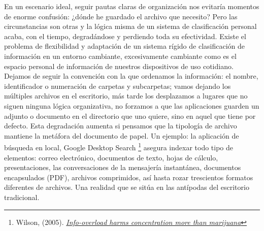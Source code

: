 \documentclass[12pt, a4paper,twoside]{book}
\begin{document}
En un escenario ideal, seguir pautas claras de organización nos
evitaría momentos de enorme confusión: ¿dónde he guardado el
archivo que necesito? Pero las circunstancias son otras y la lógica
misma de un sistema de clasificación personal acaba, con el tiempo,
degradándose y perdiendo toda su efectividad. Existe el problema de
flexibilidad y adaptación de un sistema rígido de clasificación de
información en un entorno cambiante, excesivamente cambiante como
es el espacio personal de información de nuestros dispositivos de
uso cotidiano. Dejamos de seguir la convención con la que ordenamos
la información: el nombre, identificador o numeración de carpetas y
subcarpetas; vamos dejando los múltiples archivos en el escritorio,
más tarde los desplazamos a lugares que no siguen ninguna lógica
organizativa, no forzamos a que las aplicaciones guarden un adjunto
o documento en el directorio que uno quiere, sino en aquel que
tiene por defecto. Esta degradación aumenta si pensamos que la
tipología de archivo mantiene la metáfora del documento de papel.
Un ejemplo: la aplicación de búsqueda en local, Google Desktop
Search%
\footnote{Wilson, (2005).
\emph{\href{http://www.newscientist.com/article/mg18624973.400}{Info-overload harms concentration more than marijuana}}}
asegura indexar todo tipo de elementos: correo electrónico,
documentos de texto, hojas de cálculo, presentaciones, las
conversaciones de la mensajería instantánea, documentos
encapsulados (PDF), archivos comprimidos, así hasta rozar
trescientos formatos diferentes de archivos. Una realidad que se
sitúa en las antípodas del escritorio tradicional.
\end{document}

